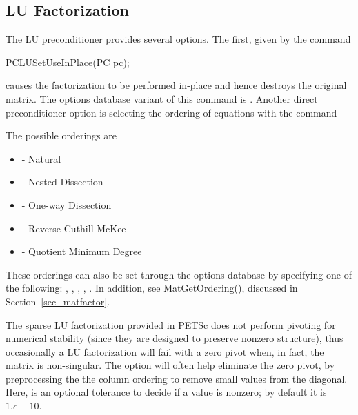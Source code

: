 \subsection{LU Factorization}
\label{sec_factorization}

The LU preconditioner provides several options.  The first, given by
the 
command  
\begin{tabbing}
  PCLUSetUseInPlace(PC pc);
\end{tabbing}
causes the factorization to be performed in-place and hence
destroys the original matrix.  The options database variant of
this command is . 
Another direct preconditioner option is selecting the ordering
of equations with the command  
\begin{tabbing}
\end{tabbing}
The possible orderings are
\begin{itemize}
\item {} - Natural
\item {} - Nested Dissection
\item {} - One-way Dissection
\item {} - Reverse Cuthill-McKee
\item {} - Quotient Minimum Degree
\end{itemize}
  
  
  
 
These orderings can also be set through the options database by specifying 
one of the following:   , 
,  ,  ,
 .
In addition, see 
\break MatGetOrdering(), discussed in Section~\ref{sec_matfactor}.

The sparse LU factorization provided in PETSc does not perform pivoting for 
numerical stability (since they are designed to preserve nonzero 
structure), thus occasionally a LU factorization will fail with a zero 
pivot when, in fact, the matrix is non-singular. The option
 
will often help eliminate the zero pivot, by preprocessing the the 
column ordering to remove small values from the diagonal. Here, 
is an optional tolerance to decide if a value is nonzero; by default it
is $ 1.e-10.$ 


